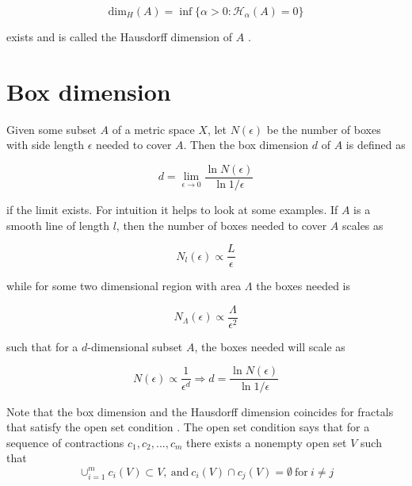 \begin{equation}
    \text{dim}_H (A) = \inf \{ \alpha > 0 : \mathcal{H}_\alpha (A) = 0 \}
\end{equation}

\noindent exists and is called the Hausdorff dimension of $A$ \cite{Heinonen:HausdorffDimMath}.


\section{Box dimension}
\label{sec:boxdimension}

Given some subset $A$ of a metric space $X$, let $N(\epsilon)$ be the number of boxes with side length $\epsilon$ needed to cover $A$. Then the box dimension $d$ of $A$ is defined as \cite{strogatz:dynamics_chaos}

\begin{equation}
    d = \lim_{\epsilon \to 0} \frac{\ln N(\epsilon)}{\ln 1 / \epsilon}
\end{equation}

\noindent if the limit exists. For intuition it helps to look at some examples. If $A$ is a smooth line of length $l$, then the number of boxes needed to cover $A$ scales as

\begin{equation}
    N_l(\epsilon) \propto \frac{L}{\epsilon}
\end{equation}


\newpage


\noindent while for some two dimensional region with area $\Lambda$ the boxes needed is

\begin{equation}
    N_{\Lambda}(\epsilon) \propto \frac{\Lambda}{\epsilon^2}
\end{equation}

\noindent such that for a $d$-dimensional subset $A$, the boxes needed will scale as

\begin{equation}
    N (\epsilon) \propto \frac{1}{\epsilon^d} \Rightarrow d = \frac{\ln N(\epsilon)}{\ln 1 / \epsilon}
\end{equation}

Note that the box dimension and the Hausdorff dimension coincides for fractals that satisfy the open set condition \cite{Falconer:RelHausdorffBox}. The open set condition \cite{Bandt:OSC} says that for a sequence of contractions $c_1, c_2, ..., c_m$ there exists a nonempty open set $V$ such that
\begin{equation}
    \cup_{i = 1}^m c_i(V) \subset V, \ \text{and} \ c_i(V) \cap c_j(V) = \emptyset \ \text{for} \ i \neq j
\end{equation}

